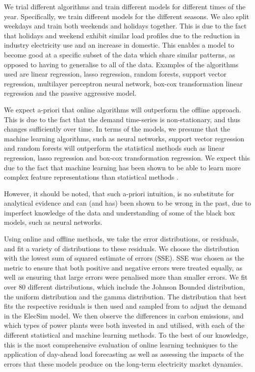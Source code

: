 We trial different algorithms and train different models for different times of the year. Specifically, we train different models for the different seasons. We also split weekdays and train both weekends and holidays together. This is due to the fact that holidays and weekend exhibit similar load profiles due to the reduction in industry electricity use and an increase in domestic. This enables a model to become good at a specific subset of the data which share similar patterns, as opposed to having to generalise to all of the data. Examples of the algorithms used are linear regression, lasso regression, random forests, support vector regression, multilayer perceptron neural network, box-cox transformation linear regression and the passive aggressive model. 

We expect a-priori that online algorithms will outperform the offline approach. This is due to the fact that the demand time-series is non-stationary, and thus changes sufficiently over time. In terms of the models, we presume that the machine learning algorithms, such as neural networks, support vector regression and random forests will outperform the statistical methods such as linear regression, lasso regression and box-cox transformation regression. We expect this due to the fact that machine learning has been shown to be able to learn more complex feature representations than statistical methods \cite{Singh2012}. %

However, it should be noted, that such a-priori intuition, is no substitute for analytical evidence and can (and has) been shown to be wrong in the past, due to imperfect knowledge of the data and understanding of some of the black box models, such as neural networks.

Using online and offline methods, we take the error distributions, or residuals, and fit a variety of distributions to these residuals. We choose the distribution with the lowest sum of squared estimate of errors (SSE). SSE was chosen as the metric to ensure that both positive and negative errors were treated equally, as well as ensuring that large errors were penalised more than smaller errors. We fit over 80 different distributions, which include the Johnson Bounded distribution, the uniform distribution and the gamma distribution. The distribution that best fits the respective residuals is then used and sampled from to adjust the demand in the ElecSim model. We then observe the differences in carbon emissions, and which types of power plants were both invested in and utilised, with each of the different statistical and machine learning methods. To the best of our knowledge, this is the most comprehensive evaluation of online learning techniques to the application of day-ahead load forecasting as well as assessing the impacts of the errors that these models produce on the long-term electricity market dynamics.





